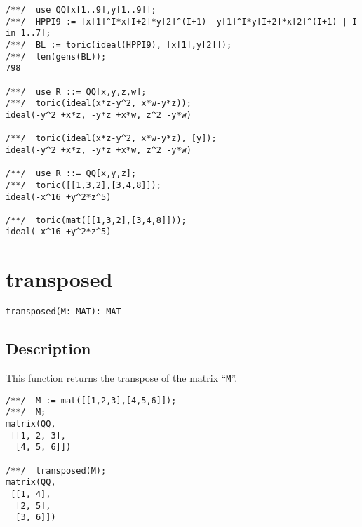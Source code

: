 \documentclass[a4paper]{mybook}
\newenvironment{command}{}{} %
\begin{document}
\begin{command}
\begin{Verbatim}[label=example, rulecolor=\color{PineGreen}, frame=single]
/**/  use QQ[x[1..9],y[1..9]];
/**/  HPPI9 := [x[1]^I*x[I+2]*y[2]^(I+1) -y[1]^I*y[I+2]*x[2]^(I+1) | I in 1..7];
/**/  BL := toric(ideal(HPPI9), [x[1],y[2]]);
/**/  len(gens(BL));
798

/**/  use R ::= QQ[x,y,z,w];
/**/  toric(ideal(x*z-y^2, x*w-y*z));
ideal(-y^2 +x*z, -y*z +x*w, z^2 -y*w)

/**/  toric(ideal(x*z-y^2, x*w-y*z), [y]);
ideal(-y^2 +x*z, -y*z +x*w, z^2 -y*w)

/**/  use R ::= QQ[x,y,z];
/**/  toric([[1,3,2],[3,4,8]]);
ideal(-x^16 +y^2*z^5)

/**/  toric(mat([[1,3,2],[3,4,8]]));
ideal(-x^16 +y^2*z^5)
\end{Verbatim}


\end{command} %

\section{transposed}
\label{transposed}
\begin{command} %


\begin{Verbatim}[label=syntax, rulecolor=\color{MidnightBlue},
frame=single]
transposed(M: MAT): MAT
\end{Verbatim}


\subsection*{Description}

This function returns the transpose of the matrix ``\verb&M&''.
\begin{Verbatim}[label=example, rulecolor=\color{PineGreen}, frame=single]
/**/  M := mat([[1,2,3],[4,5,6]]);
/**/  M;
matrix(QQ,
 [[1, 2, 3],
  [4, 5, 6]])

/**/  transposed(M);
matrix(QQ,
 [[1, 4],
  [2, 5],
  [3, 6]])
\end{Verbatim}


\end{command} %
\end{document}
